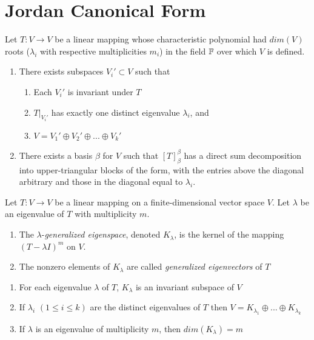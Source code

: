 \documentclass[12pt]{report}
\begin{document}
\section{Jordan Canonical Form}


\begin{prop}{}{}
    Let $T:V\rightarrow V$ be a linear mapping whose characteristic polynomial had $dim(V)$ roots ($\lambda_i$ with respective multiplicities $m_i$) in the field $\mathbb F$ over which $V$ is defined.
    \begin{enumerate}
        \item There exists subspaces $V_i' \subset V$ such that \begin{enumerate}
            \item Each $V_i'$ is invariant under $T$
            \item $T\rvert_{V_i'}$ has exactly one distinct eigenvalue $\lambda_i$, and 
            \item $V = V_1' \oplus V_2' \oplus ... \oplus V_k'$
        \end{enumerate}
        \item There exists a basis $\beta$ for $V$ such that $[T]_{\beta}^{\beta}$ has a direct sum decomposition into upper-triangular blocks of the form, with the entries above the diagonal arbitrary and those in the diagonal equal to $\lambda_i$.
    \end{enumerate}
\end{prop}

\begin{defn}{}{}
    Let $T:V\rightarrow V$ be a linear mapping on a finite-dimensional vector space $V$. Let $\lambda$ be an eigenvalue of $T$ with multiplicity $m$. \begin{enumerate}
        \item The $\lambda$-\emph{generalized eigenspace}, denoted $K_{\lambda}$, is the kernel of the mapping $(T-\lambda I)^m$ on $V$.
        \item The nonzero elements of $K_{\lambda}$ are called \emph{generalized eigenvectors} of $T$
    \end{enumerate}
\end{defn}

\begin{prop}{}{}
    \leavevmode
    \begin{enumerate}
        \item For each eigenvalue $\lambda$ of $T$, $K_{\lambda}$ is an invariant subspace of $V$
        \item If $\lambda_i$ $(1\leq i \leq k)$ are the distinct eigenvalues of $T$ then $V = K_{\lambda_1} \oplus ... \oplus K_{\lambda_k}$
        \item If $\lambda$ is an eigenvalue of multiplicity $m$, then $dim(K_{\lambda}) = m$
    \end{enumerate}
\end{prop}
\end{document}
